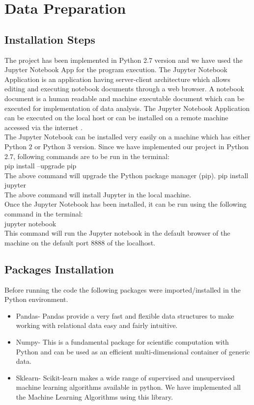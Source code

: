 \section{Data Preparation}

\subsection{Installation Steps}
The project has been implemented in Python 2.7 version and we have used the Jupyter Notebook App for the program execution. The Jupyter Notebook Application is an application having server-client architecture which allows editing and executing notebook documents through a web browser. A notebook document is a human readable and machine executable document which can be executed for implementation of data analysis. The Jupyter Notebook Application can be executed on the local host or can be installed on a remote machine accessed via the internet \cite{link15}. \\
The Jupyter Notebook can be installed very easily on a machine which has either Python $2$ or Python $3$ version. Since we have implemented our project in Python 2.7, following commands are to be run in the terminal:\\
pip install --upgrade pip \\
The above command will upgrade the Python package manager (pip).
pip install jupyter \\
The above command will install Jupyter in the local machine.\\
Once the Jupyter Notebook has been installed, it can be run using the following command in the terminal:\\
jupyter notebook\\
This command will run the Jupyter notebook in the default browser of the machine on the default port $8888$ of the localhost.

\subsection{Packages Installation}
Before running the code the following packages were imported/installed in the Python environment.

\begin{itemize}
    \item Pandas-
    Pandas provide a very fast and flexible data structures to make working with relational data easy and fairly intuitive.
    \item Numpy-
    This is a fundamental package for scientific computation with Python and can be used as an efficient multi-dimensional container of generic data.
    \item Sklearn-
    Scikit-learn makes a wide range of supervised and unsupervised machine learning algorithms  available in python. We have implemented all the Machine Learning Algorithms using this library.
\end{itemize}


